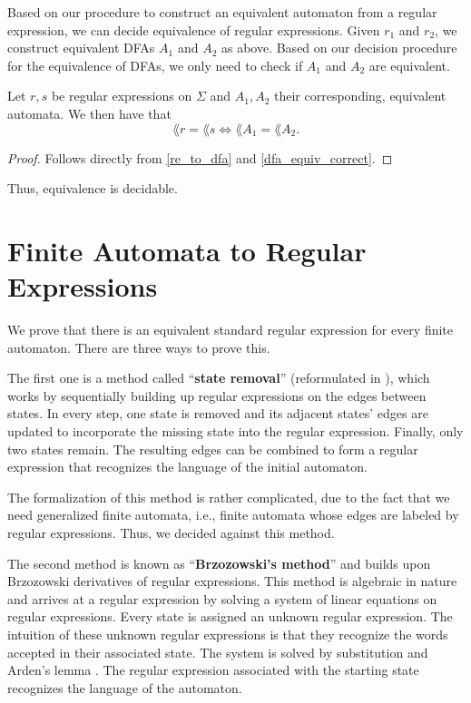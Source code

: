  
Based on our procedure to construct an equivalent automaton from a regular expression, we can decide equivalence of regular expressions. Given $r_1$ and $r_2$, we construct equivalent DFAs $A_1$ and $A_2$ as above.
Based on our decision procedure for the equivalence of DFAs, we only need to check if $A_1$ and $A_2$ are equivalent.

\begin{theorem} 
    \label{re_equiv_correct}
    Let $r, s$ be regular expressions on $\Sigma$ and $A_1, A_2$ their corresponding, equivalent automata. 
    We then have that
    \begin{equation*}
        \lang{r} = \lang{s} \iff \lang{A_1} = \lang{A_2}.
    \end{equation*}
\end{theorem}
\begin{proof}
    Follows directly from \ref{re_to_dfa} and \ref{dfa_equiv_correct}.
\end{proof}

Thus, equivalence is decidable.


\section{Finite Automata to Regular Expressions}
We prove that there is an equivalent standard regular expression for every finite automaton.
There are three ways to prove this. 


The first one is a method called ``\textbf{state removal}'' \cite{SignalFlow} (reformulated in \cite{springerlink:10.1007/978-3-540-30500-2}),
which works by sequentially building up regular expressions on the edges between states. 
In every step, one state is removed and its adjacent states' edges are updated to incorporate the missing state into the regular expression.
Finally, only two states remain. The resulting edges can be combined to form a regular expression that recognizes the language of the initial automaton.

The formalization of this method is rather complicated, due to the fact that we need generalized finite automata, i.e., 
finite automata whose edges are labeled by regular expressions. 
Thus, we decided against this method.


The second method is known as ``\textbf{Brzozowski's method}'' \cite{DBLP:journals/jacm/Brzozowski64} and builds upon Brzozowski derivatives of regular expressions.
This method is algebraic in nature and arrives at a regular expression by solving a system of linear equations on regular expressions. 
Every state is assigned an unknown regular expression. 
The intuition of these unknown regular expressions is that they recognize the words accepted in their associated state. 
The system is solved by substitution and Arden's lemma \cite{DBLP:conf/focs/Arden61}.
The regular expression associated with the starting state recognizes the language of the automaton.

